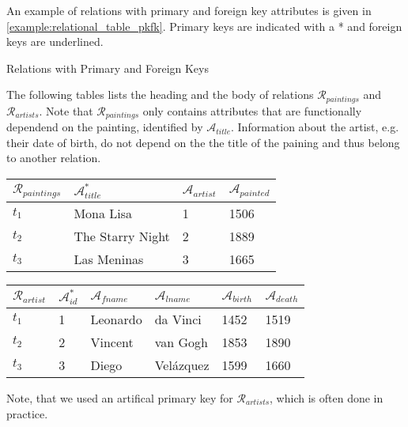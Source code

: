 An example of relations with primary and foreign key attributes is given in \cref{example:relational_table_pkfk}. Primary keys are indicated with a * and foreign keys are underlined.

\begin{example}[label=example:relational_table_pkfk]{Relations with Primary and Foreign Keys}{}
    
    The following tables lists the heading and the body of relations $\mathcal{R}_{paintings}$ and $\mathcal{R}_{artists}$.  Note that $\mathcal{R}_{paintings}$ only contains attributes that are functionally dependend on the painting, identified by $\mathcal{A}_{title}$. Information about the artist, e.g. their date of birth, do not depend on the the title of the paining and thus belong to another relation.
        
    \begin{center}
        \begin{tabular}{ l || l | l | l |}
            $\mathcal{R}_{paintings}$ & $\mathcal{A}^{*}_{title}$  & $\mathcal{A}_{artist}$  & $\mathcal{A}_{painted}$ \\ 
            \hline
            \hline
            $t_1$ & Mona Lisa &  1 & 1506 \\
            \hline
            $t_2$ & The Starry Night & 2 & 1889 \\
            \hline
            $t_3$ & Las Meninas & 3 & 1665 \\
            \hline
        \end{tabular}
    \end{center}

    \begin{center}
        \begin{tabular}{ l || l | l | l | l | l |}
            $\mathcal{R}_{artist}$ & $\mathcal{A}^{*}_{id}$ & $\mathcal{A}_{fname}$ & $\mathcal{A}_{lname}$ & $\mathcal{A}_{birth}$ & $\mathcal{A}_{death}$\\ 
            \hline
            \hline
            $t_1$ & 1 & Leonardo & da Vinci & 1452 & 1519 \\
            \hline
            $t_2$ & 2 & Vincent & van Gogh & 1853 & 1890 \\
            \hline
            $t_3$ & 3 & Diego & Velázquez & 1599 & 1660 \\
            \hline
        \end{tabular}
    \end{center}

    Note, that we used an artifical primary key for $\mathcal{R}_{artists}$, which is often done in practice.
\end{example}


